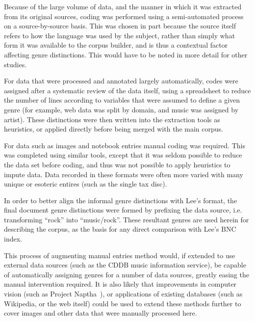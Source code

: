 Because of the large volume of data, and the manner in which it was extracted from its original sources, coding was performed using a semi-automated process on a source-by-source basis.  This was chosen in part because the source itself refers to how the language was used by the subject, rather than simply what form it was available to the corpus builder, and is thus a contextual factor affecting genre distinctions.  This would have to be noted in more detail for other studies.

For data that were processed and annotated largely automatically, codes were assigned after a systematic review of the data itself, using a spreadsheet to reduce the number of lines according to variables that were assumed to define a given genre (for example, web data was split by domain, and music was assigned by artist).  These distinctions were then written into the extraction tools as heuristics, or applied directly before being merged with the main corpus.

For data such as images and notebook entries manual coding was required.  This was completed using similar tools, except that it was seldom possible to reduce the data set before coding, and thus was not possible to apply heuristics to impute data.  Data recorded in these formats were often more varied with many unique or esoteric entires (such as the single tax disc).

In order to better align the informal genre distinctions with Lee's format, the final document genre distinctions were formed by prefixing the data source, i.e. transforming ``rock'' into ``music/rock''.  These resultant genres are used herein for describing the corpus, as the basis for any direct comparison with Lee's BNC index.




This process of augmenting manual entries method would, if extended to use external data sources (such as the CDDB music information service), be capable of automatically assigning genres for a number of data sources, greatly easing the manual intervention required.  It is also likely that improvements in computer vision (such as Project Naptha~\cite{naptha2014homepage}), or applications of existing databases (such as Wikipedia, or the web itself) could be used to extend these methods further to cover images and other data that were manually processed here.
